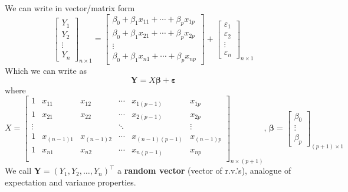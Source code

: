 We can write in vector/matrix form
\[ \begin{bmatrix}
        Y_1    \\
        Y_2    \\
        \vdots \\
        Y_n
    \end{bmatrix}_{n\times 1}=
    \begin{bmatrix}
        \beta_0+\beta_1x_{11}+\cdots+\beta_p x_{1p} \\
        \beta_0+\beta_1x_{21}+\cdots+\beta_p x_{2p} \\
        \vdots                                      \\
        \beta_0+\beta_1x_{n1}+\cdots+\beta_p x_{np}
    \end{bmatrix}+
    \begin{bmatrix}
        \varepsilon_1 \\
        \varepsilon_2 \\
        \vdots        \\
        \varepsilon_n
    \end{bmatrix}_{n\times 1} \]
Which we can write as
\[ \symbf{Y}=X\symbf{\beta}+\symbf{\varepsilon} \]
where
\[
    X=
    \begin{bmatrix}
        1      & x_{11}     & x_{12}     & \cdots & x_{1(p-1)}     & x_{1p}     \\
        1      & x_{21}     & x_{22}     & \cdots & x_{2(p-1)}     & x_{2p}     \\
        \vdots &            &            & \ddots &                & \vdots     \\
        1      & x_{(n-1)1} & x_{(n-1)2} & \cdots & x_{(n-1)(p-1)} & x_{(n-1)p} \\
        1      & x_{n1}     & x_{n2}     & \cdots & x_{n(p-1)}     & x_{np}     \\
    \end{bmatrix}_{n\times(p+1)},\,
    \symbf{\beta}=
    \begin{bmatrix}
        \beta_0 \\
        \vdots  \\
        \beta_p
    \end{bmatrix}_{(p+1)\times 1} \]
We call $ \symbf{Y}=(Y_1,Y_2,\ldots,Y_{n})^\top $
a \textbf{random vector} (vector of r.v.'s), analogue of
expectation and variance properties.
